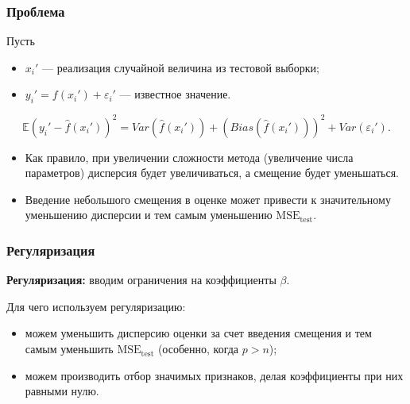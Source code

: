 \documentclass[unicode, notheorems]{beamer}
\newcommand{\E}{\mathbb{E}}
\begin{document}
\begin{frame}
\frametitle{Проблема}

Пусть
\begin{itemize}
\item $x_i'$ --- реализация случайной величина из тестовой выборки;
\item $y_i' = f(x_i') + \varepsilon_i'$ --- известное значение.
\end{itemize}

\[\E(y_i' - \hat{f}(x_i'))^2 = Var(\hat{f}(x_i')) + (Bias(\hat{f}(x_i')))^2 + Var(\varepsilon_i').\]

\vspace{0.8cm}
\begin{itemize}
\item Как правило, при увеличении сложности метода (увеличение числа параметров) дисперсия будет увеличиваться, а смещение будет уменьшаться.
\item Введение небольшого смещения в оценке может привести к значительному уменьшению дисперсии и тем самым уменьшению $\mathrm{MSE}_{\mathrm{test}}$.  
\end{itemize}


\end{frame}




\begin{frame}
\frametitle{Регуляризация}

\textbf{Регуляризация:} вводим ограничения на коэффициенты $\beta$.

\vspace{0.8cm}
Для чего используем регуляризацию:
\begin{itemize}
\item можем уменьшить дисперсию оценки за счет введения смещения и тем самым уменьшить $\mathrm{MSE}_{\mathrm{test}}$ (особенно, когда $p >n$);
\item можем производить отбор значимых признаков, делая коэффициенты при них равными нулю.
\end{itemize}


\end{frame}
\end{document}
